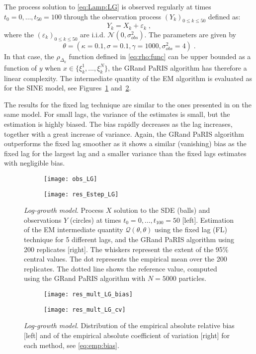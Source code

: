\documentclass[12pt]{article}
\newcommand{\eqsp}{\;}
\newcommand{\1}{\mathrm{1}}
\begin{document}
The process solution to \eqref{eq:Lamp:LG} is observed regularly at times $t_0=0,\dots,t_{50}=100$ through the observation process $(Y_k)_{0\le k\le 50}$ defined as:
\begin{equation}
Y_k = X_k + \varepsilon_k\label{eq:obs:LG}\eqsp,
\end{equation}
where the $(\varepsilon_k)_{0\le k \le 50}$ are i.i.d. $ \mathcal{N}(0,\sigma^2_{obs})$.
The parameters are given by $$\theta =(\kappa=0.1,\sigma=0.1,\gamma=1000,\sigma^2_{obs}=4)\eqsp.$$
In that case, the $\rho_{\Delta_k}$ function defined in \eqref{eq:rho:func} can be upper bounded as a function of $y$ when $x\in \{\xi_k^1,\dots, \xi_k^N\}$, the GRand PaRIS algorithm has therefore a linear complexity. The intermediate quantity of the EM algorithm is evaluated  as for the SINE model, see Figures~\ref{fig:res:LG} and~\ref{fig:mult:LG}.

The results for the fixed lag technique are similar to the ones presented in \cite[Figure 1]{olsson:strojby:2011} on the same model. For small lags, the variance of the estimates is small, but the estimation is highly biased. The bias rapidly decreases as the lag increases, together with a  great increase of variance.  Again, the GRand PaRIS algorithm outperforms the fixed lag smoother as it shows  a similar (vanishing) bias as the fixed lag for the largest lag and a smaller variance than the fixed lags estimates with negligible bias. 

\begin{figure}[p]
\centering
\begin{subfigure}{0.49\textwidth}
\texttt{[image: obs\_LG]}
\end{subfigure}
\begin{subfigure}{0.49\textwidth}
\texttt{[image: res\_Estep\_LG]}
\end{subfigure}
\caption{{\em Log-growth model}. Process $X$ solution to the SDE (balls) and observations $Y$ (circles) at times $t_0=0,\dots,t_{100}=50$ [left]. Estimation of the EM intermediate quantity $\mathcal{Q}(\theta,\theta)$  using the fixed lag (FL) technique for 5 different lags, and the GRand PaRIS algorithm using 200 replicates [right]. The whiskers represent the extent of the 95\% central values. The dot represents the empirical mean over the 200 replicates. The dotted line shows the reference value, computed using the GRand PaRIS algorithm with $N=5000$ particles.}
\label{fig:res:LG}
\end{figure}
\begin{figure}[p]
\centering
\begin{subfigure}{0.49\textwidth}
\texttt{[image: res\_mult\_LG\_bias]}
\end{subfigure}
\begin{subfigure}{0.49\textwidth}
\texttt{[image: res\_mult\_LG\_cv]}
\end{subfigure}
\caption{{\em Log-growth model}. Distribution of the empirical absolute relative bias [left] and of the empirical absolute coefficient of variation [right] for each method, see \eqref{eq:emp:bias}.}
\label{fig:mult:LG}
\end{figure}
\end{document}
